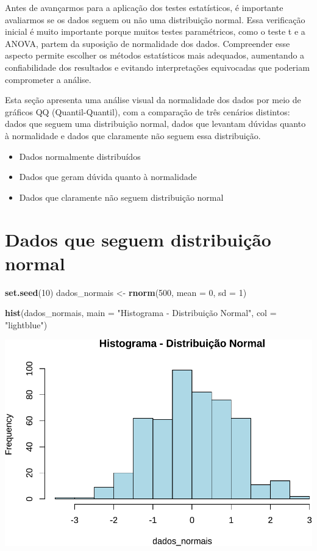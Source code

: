 \documentclass[
]{book}
\newenvironment{Shaded}{\begin{snugshade}}{\end{snugshade}}
\newcommand{\AttributeTok}[1]{\textcolor[rgb]{0.13,0.29,0.53}{#1}}
\newcommand{\DecValTok}[1]{\textcolor[rgb]{0.00,0.00,0.81}{#1}}
\newcommand{\FunctionTok}[1]{\textcolor[rgb]{0.13,0.29,0.53}{\textbf{#1}}}
\newcommand{\NormalTok}[1]{#1}
\newcommand{\OtherTok}[1]{\textcolor[rgb]{0.56,0.35,0.01}{#1}}
\newcommand{\StringTok}[1]{\textcolor[rgb]{0.31,0.60,0.02}{#1}}
\providecommand{\tightlist}{%
  \setlength{\itemsep}{0pt}\setlength{\parskip}{0pt}}
\begin{document}
Antes de avançarmos para a aplicação dos testes estatísticos, é importante avaliarmos se os dados seguem ou não uma distribuição normal. Essa verificação inicial é muito importante porque muitos testes paramétricos, como o teste t e a ANOVA, partem da suposição de normalidade dos dados. Compreender esse aspecto permite escolher os métodos estatísticos mais adequados, aumentando a confiabilidade dos resultados e evitando interpretações equivocadas que poderiam comprometer a análise.

Esta seção apresenta uma análise visual da normalidade dos dados por meio de gráficos QQ (Quantil-Quantil), com a comparação de três cenários distintos: dados que seguem uma distribuição normal, dados que levantam dúvidas quanto à normalidade e dados que claramente não seguem essa distribuição.

\begin{itemize}
\tightlist
\item
  Dados normalmente distribuídos
\item
  Dados que geram dúvida quanto à normalidade
\item
  Dados que claramente não seguem distribuição normal
\end{itemize}

\section{Dados que seguem distribuição normal}\label{dados-que-seguem-distribuiuxe7uxe3o-normal}

\begin{Shaded}
\begin{Highlighting}[]
\FunctionTok{set.seed}\NormalTok{(}\DecValTok{10}\NormalTok{)}
\NormalTok{dados\_normais }\OtherTok{\textless{}{-}} \FunctionTok{rnorm}\NormalTok{(}\DecValTok{500}\NormalTok{, }\AttributeTok{mean =} \DecValTok{0}\NormalTok{, }\AttributeTok{sd =} \DecValTok{1}\NormalTok{)}

\FunctionTok{hist}\NormalTok{(dados\_normais, }\AttributeTok{main =} \StringTok{"Histograma {-} Distribuição Normal"}\NormalTok{, }\AttributeTok{col =} \StringTok{"lightblue"}\NormalTok{)}
\end{Highlighting}
\end{Shaded}

\includegraphics{Livro-Estatistica+R_files/figure-latex/enormal-1.pdf}
\end{document}
